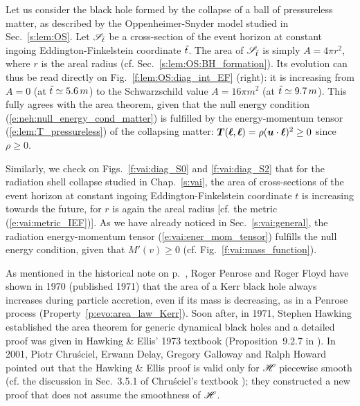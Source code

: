 \begin{example}
Let us consider the black hole formed by the collapse
of a ball of pressureless matter, as described by the Oppenheimer-Snyder
model studied in Sec.~\ref{s:lem:OS}. Let $\mathscr{S}_{{\tilde t}}$ be a
cross-section of the event horizon at constant ingoing Eddington-Finkelstein coordinate ${\tilde t}$.
The area of $\mathscr{S}_{{\tilde t}}$ is simply $A = 4\pi r^2$,
where $r$ is the areal radius (cf. Sec.~\ref{s:lem:OS:BH_formation}). Its
evolution can thus be read directly on Fig.~\ref{f:lem:OS:diag_int_EF} (right):
it is increasing from $A = 0$ (at ${\tilde t}\simeq 5.6\, m$) to the Schwarzschild
value $A = 16\pi m^2$ (at ${\tilde t}\simeq 9.7\, m$). This fully agrees
with the area theorem, given that the null energy condition (\ref{e:neh:null_energy_cond_matter})
is fulfilled by the energy-momentum tensor (\ref{e:lem:T_pressureless}) of the collapsing matter: $\bm{T}(\bm{\ell},\bm{\ell}) =  \rho (\bm{u}\cdot\bm{\ell})^2 \geq 0$ since $\rho \geq 0$.
\end{example}

\begin{example}
Similarly, we check on Figs.~\ref{f:vai:diag_S0} and \ref{f:vai:diag_S2}
that for the radiation shell collapse studied in Chap.~\ref{s:vai},
the area of cross-sections of the event horizon
at constant ingoing Eddington-Finkelstein coordinate $t$
is increasing towards the future, for $r$ is again the areal radius
[cf. the metric (\ref{e:vai:metric_IEF})]. As we have already noticed in
Sec.~\ref{s:vai:general}, the radiation energy-momentum tensor (\ref{e:vai:ener_mom_tensor})
fulfills the null energy condition, given that $M'(v) \geq 0$ (cf. Fig.~\ref{f:vai:mass_function}).
\end{example}


\begin{hist}
As mentioned in the historical note on p.~\pageref{h:evo:irreducible_mass},
Roger Penrose
and Roger Floyd \cite{PenroF71}
have shown in 1970 (published 1971)
that the area of a Kerr black hole always increases during particle accretion,
even if its mass is decreasing, as in a Penrose process (Property~\ref{p:evo:area_law_Kerr}).
Soon after, in 1971, Stephen Hawking
\cite{Hawki71} established the area theorem for generic
dynamical black holes and a detailed proof was given in
Hawking \& Ellis' 1973 textbook (Proposition~9.2.7 in \cite{HawkiE73}).
In 2001, Piotr Chru\'sciel,
Erwann Delay,
Gregory Galloway and Ralph Howard
\cite{ChrusDGH01} pointed out that the Hawking \& Ellis proof is
valid only for $\mathscr{H}$ piecewise smooth (cf. the
discussion in Sec.~3.5.1 of Chru\'sciel's textbook \cite{Chrus20}); they constructed
a new proof that does not assume the smoothness of $\mathscr{H}$.
\end{hist}

